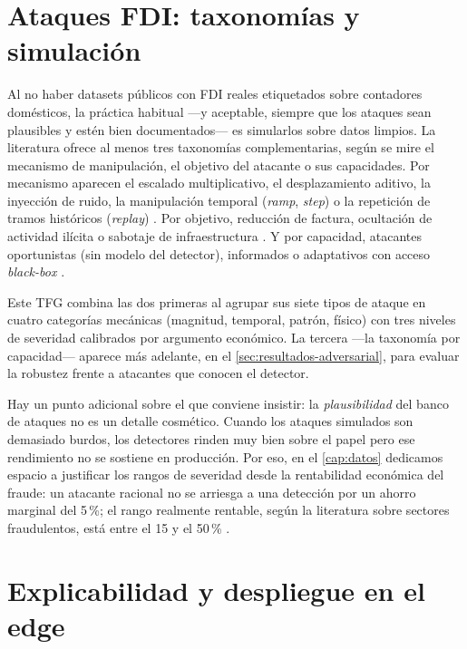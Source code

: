 \section{Ataques FDI: taxonomías y simulación}
\label{sec:soa-fdi}

Al no haber datasets públicos con FDI reales etiquetados sobre contadores domésticos, la práctica habitual ---y aceptable, siempre que los ataques sean plausibles y estén bien documentados--- es simularlos sobre datos limpios. La literatura ofrece al menos tres taxonomías complementarias, según se mire el mecanismo de manipulación, el objetivo del atacante o sus capacidades. Por mecanismo aparecen el escalado multiplicativo, el desplazamiento aditivo, la inyección de ruido, la manipulación temporal (\textit{ramp}, \textit{step}) o la repetición de tramos históricos (\textit{replay}) \cite{jokar2016electricity,buzau2018detection}. Por objetivo, reducción de factura, ocultación de actividad ilícita o sabotaje de infraestructura \cite{messinis2018review}. Y por capacidad, atacantes oportunistas (sin modelo del detector), informados o adaptativos con acceso \textit{black-box} \cite{shokri2017membership,kos2018adversarial}.

Este TFG combina las dos primeras al agrupar sus siete tipos de ataque en cuatro categorías mecánicas (magnitud, temporal, patrón, físico) con tres niveles de severidad calibrados por argumento económico. La tercera ---la taxonomía por capacidad--- aparece más adelante, en el \cref{sec:resultados-adversarial}, para evaluar la robustez frente a atacantes que conocen el detector.

Hay un punto adicional sobre el que conviene insistir: la \emph{plausibilidad} del banco de ataques no es un detalle cosmético. Cuando los ataques simulados son demasiado burdos, los detectores rinden muy bien sobre el papel pero ese rendimiento no se sostiene en producción. Por eso, en el \cref{cap:datos} dedicamos espacio a justificar los rangos de severidad desde la rentabilidad económica del fraude: un atacante racional no se arriesga a una detección por un ahorro marginal del 5\,\%; el rango realmente rentable, según la literatura sobre sectores fraudulentos, está entre el 15 y el 50\,\% \cite{messinis2018review}.

\section{Explicabilidad y despliegue en el edge}
\label{sec:soa-xai-edge}


